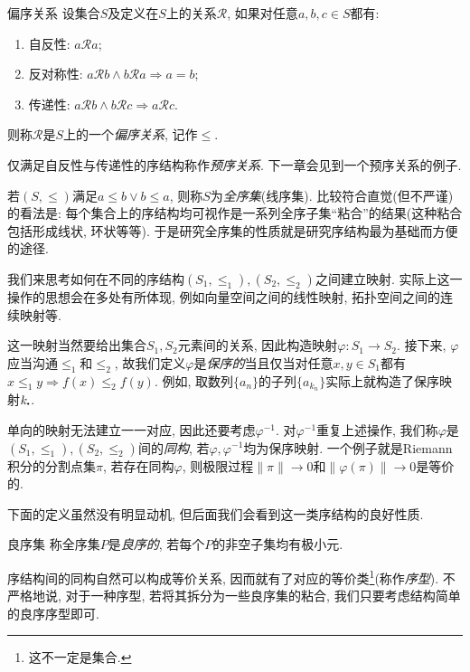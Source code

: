 \begin{definition}{偏序关系}
	设集合$S$及定义在$S$上的关系$\mathcal{R}$, 如果对任意$a, b, c \in S$都有: 
	\begin{enumerate}
		\item 自反性: $a\mathcal{R} a$; 
		\item 反对称性: $a\mathcal{R} b \wedge b\mathcal{R} a \Rightarrow a=b$; 
		\item 传递性: $a\mathcal{R} b \wedge b\mathcal{R} c \Rightarrow a\mathcal{R} c$.
	\end{enumerate}
	则称$\mathcal{R}$是$S$上的一个\textit{偏序关系}, 记作$\leq$.
\end{definition}
\begin{remark}
	仅满足自反性与传递性的序结构称作\textit{预序关系}. 下一章会见到一个预序关系的例子. 
\end{remark}
\begin{remark}
	若$(S,\leq)$满足$a \leq b \vee b \leq a$, 则称$S$为\textit{全序集}(线序集). 比较符合直觉(但不严谨)的看法是: 每个集合上的序结构均可视作是一系列全序子集“粘合”的结果(这种粘合包括形成线状, 环状等等). 于是研究全序集的性质就是研究序结构最为基础而方便的途径. 
\end{remark}

我们来思考如何在不同的序结构$(S_1,\leq _1),(S_2,\leq _2)$之间建立映射. 实际上这一操作的思想会在多处有所体现, 例如向量空间之间的线性映射, 拓扑空间之间的连续映射等. 

这一映射当然要给出集合$S_1,S_2$元素间的关系, 因此构造映射$\varphi :S_1 \to S_2$. 接下来, $\varphi$应当沟通$\leq _1$和$\leq _2$, 故我们定义$\varphi$是\textit{保序的}当且仅当对任意$x,y \in S_1$都有$x \leq _1 y \Rightarrow f(x) \leq _2 f(y)$. 例如, 取数列$\{ a_n \}$的子列$\{ a_{k_n} \}$实际上就构造了保序映射$k_{\bigcdot}$. 

单向的映射无法建立一一对应, 因此还要考虑$\varphi ^{-1}$. 对$\varphi ^{-1}$重复上述操作, 我们称$\varphi$是$(S_1,\leq _1),(S_2,\leq _2)$间的\textit{同构}, 若$\varphi ,\varphi ^{-1}$均为保序映射. 一个例子就是Riemann积分的分割点集$\pi$, 若存在同构$\varphi$, 则极限过程$\| \pi \| \to 0$和$\| \varphi(\pi) \| \to 0$是等价的. 

下面的定义虽然没有明显动机, 但后面我们会看到这一类序结构的良好性质. 

\begin{definition}{良序集}
	称全序集$P$是\textit{良序的}, 若每个$P$的非空子集均有极小元. 
\end{definition}

序结构间的同构自然可以构成等价关系, 因而就有了对应的等价类\footnote{这不一定是集合. }(称作\textit{序型}). 不严格地说, 对于一种序型, 若将其拆分为一些良序集的粘合, 我们只要考虑结构简单的良序序型即可. 

